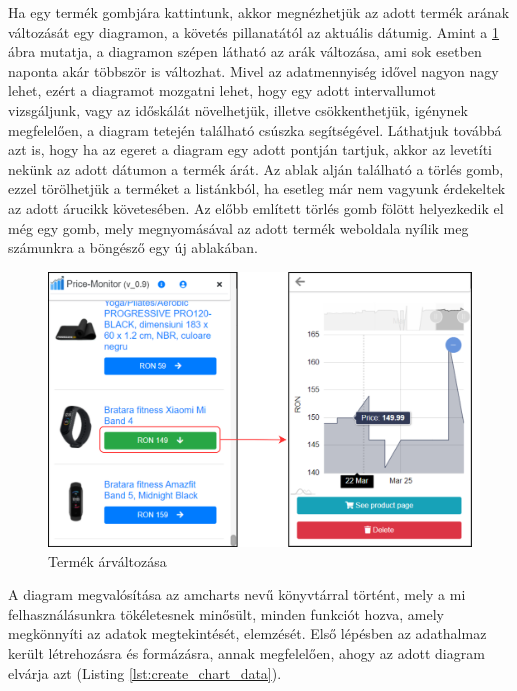 Ha egy termék gombjára kattintunk, akkor megnézhetjük az adott termék arának változását egy diagramon, a követés pillanatától az aktuális dátumig. Amint a \ref{fig:ext_chart} ábra mutatja, a diagramon szépen látható az arák változása, ami sok esetben naponta akár többször is változhat. Mivel az adatmennyiség idővel nagyon nagy lehet, ezért a diagramot mozgatni lehet, hogy egy adott intervallumot vizsgáljunk, vagy az időskálát növelhetjük, illetve csökkenthetjük, igénynek megfelelően, a diagram tetején található csúszka segítségével. Láthatjuk továbbá azt is, hogy ha az egeret a diagram egy adott pontján tartjuk, akkor az levetíti nekünk az adott dátumon a termék árát. Az ablak alján található a törlés gomb, ezzel törölhetjük a terméket a listánkból, ha esetleg már nem vagyunk érdekeltek az adott árucikk követesében. Az előbb említett törlés gomb fölött helyezkedik el még egy gomb, mely megnyomásával az adott termék weboldala nyílik meg számunkra a böngésző egy új ablakában.

\begin{figure}[H]
    \centering
    \includegraphics[scale=1]{figures/images/home_details.png}
    \caption{Termék árváltozása}
    \label{fig:ext_chart}
\end{figure}

A diagram megvalósítása az amcharts nevű könyvtárral történt, mely a mi felhasználásunkra tökéletesnek minősült, minden funkciót hozva, amely megkönnyíti az adatok megtekintését, elemzését. Első lépésben az adathalmaz került létrehozásra és formázásra, annak megfelelően, ahogy az adott diagram elvárja azt (Listing \ref{lst:create_chart_data}).



